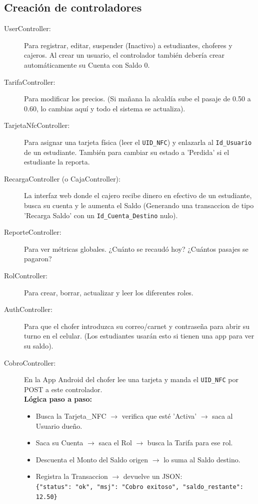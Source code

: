 \documentclass[12pt,letterpaper]{report}
\begin{document}
	
	\subsection{Creación de controladores}
	\begin{description}
		\item[UserController:] Para registrar, editar, suspender (Inactivo) a estudiantes, choferes y cajeros. Al crear un usuario, el controlador también debería crear automáticamente su Cuenta con Saldo 0.
		
		\item[TarifaController:] Para modificar los precios. (Si mañana la alcaldía sube el pasaje de 0.50 a 0.60, lo cambias aquí y todo el sistema se actualiza).
		
		\item[TarjetaNfcController:] Para asignar una tarjeta física (leer el \texttt{UID\_NFC}) y enlazarla al \texttt{Id\_Usuario} de un estudiante. También para cambiar su estado a 'Perdida' si el estudiante la reporta.
		
		\item[RecargaController (o CajaController):] La interfaz web donde el cajero recibe dinero en efectivo de un estudiante, busca su cuenta y le aumenta el Saldo (Generando una transaccion de tipo 'Recarga Saldo' con un \texttt{Id\_Cuenta\_Destino} nulo).
		
		\item[ReporteController:] Para ver métricas globales. ¿Cuánto se recaudó hoy? ¿Cuántos pasajes se pagaron?
		
		\item[RolController:] Para crear, borrar, actualizar y leer los diferentes roles.
		
		\item[AuthController:] Para que el chofer introduzca su correo/carnet y contraseña para abrir su turno en el celular. (Los estudiantes usarán esto si tienen una app para ver su saldo).
		
		\item[CobroController:] En la App Android del chofer lee una tarjeta y manda el \texttt{UID\_NFC} por POST a este controlador. \\
		\textbf{Lógica paso a paso:}
		\begin{itemize}
			\item Busca la Tarjeta\_NFC $\rightarrow$ verifica que esté 'Activa' $\rightarrow$ saca al Usuario dueño.
			\item Saca su Cuenta $\rightarrow$ saca el Rol $\rightarrow$ busca la Tarifa para ese rol.
			\item Descuenta el Monto del Saldo origen $\rightarrow$ lo suma al Saldo destino.
			\item Registra la Transaccion $\rightarrow$ devuelve un JSON: \\
			\texttt{\{"status": "ok", "msj": "Cobro exitoso", "saldo\_restante": 12.50\}}
		\end{itemize}
		

\end{description}
\end{document}
